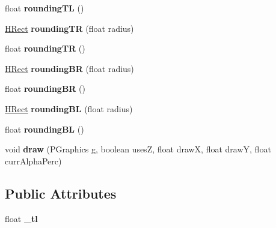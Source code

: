 \begin{DoxyCompactItemize}
\item 
\hypertarget{classhype_1_1drawable_1_1_h_rect_a765e79a1a12db4eadee8d04c2f6dc779}{float {\bfseries rounding\-T\-L} ()}\label{classhype_1_1drawable_1_1_h_rect_a765e79a1a12db4eadee8d04c2f6dc779}

\item 
\hypertarget{classhype_1_1drawable_1_1_h_rect_a45caa227a5f1d8d5c81b534ebed047e0}{\hyperlink{classhype_1_1drawable_1_1_h_rect}{H\-Rect} {\bfseries rounding\-T\-R} (float radius)}\label{classhype_1_1drawable_1_1_h_rect_a45caa227a5f1d8d5c81b534ebed047e0}

\item 
\hypertarget{classhype_1_1drawable_1_1_h_rect_a7c79febd61c038934a1b8018f519ccda}{float {\bfseries rounding\-T\-R} ()}\label{classhype_1_1drawable_1_1_h_rect_a7c79febd61c038934a1b8018f519ccda}

\item 
\hypertarget{classhype_1_1drawable_1_1_h_rect_a4a1cacf3d57d913d12bb556995f12892}{\hyperlink{classhype_1_1drawable_1_1_h_rect}{H\-Rect} {\bfseries rounding\-B\-R} (float radius)}\label{classhype_1_1drawable_1_1_h_rect_a4a1cacf3d57d913d12bb556995f12892}

\item 
\hypertarget{classhype_1_1drawable_1_1_h_rect_a096f9a60d0654c3fc05d51d5741b917e}{float {\bfseries rounding\-B\-R} ()}\label{classhype_1_1drawable_1_1_h_rect_a096f9a60d0654c3fc05d51d5741b917e}

\item 
\hypertarget{classhype_1_1drawable_1_1_h_rect_a52eda9ea544fe6feb1eeef50ac8d03e4}{\hyperlink{classhype_1_1drawable_1_1_h_rect}{H\-Rect} {\bfseries rounding\-B\-L} (float radius)}\label{classhype_1_1drawable_1_1_h_rect_a52eda9ea544fe6feb1eeef50ac8d03e4}

\item 
\hypertarget{classhype_1_1drawable_1_1_h_rect_a049a529b6800428757a8211107096ef6}{float {\bfseries rounding\-B\-L} ()}\label{classhype_1_1drawable_1_1_h_rect_a049a529b6800428757a8211107096ef6}

\item 
\hypertarget{classhype_1_1drawable_1_1_h_rect_a9eec0e9b23abc0ddf61c641d9de7f293}{void {\bfseries draw} (P\-Graphics g, boolean uses\-Z, float draw\-X, float draw\-Y, float curr\-Alpha\-Perc)}\label{classhype_1_1drawable_1_1_h_rect_a9eec0e9b23abc0ddf61c641d9de7f293}

\end{DoxyCompactItemize}
\subsection*{Public Attributes}
\begin{DoxyCompactItemize}
\item 
\hypertarget{classhype_1_1drawable_1_1_h_rect_a6f2696359b3f60a7c28cbb5d41ad6519}{float {\bfseries \-\_\-tl}}\label{classhype_1_1drawable_1_1_h_rect_a6f2696359b3f60a7c28cbb5d41ad6519}

\end{DoxyCompactItemize}

